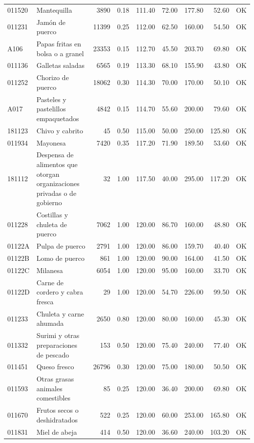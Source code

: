 \begin{table}[ht]
\begin{tabular}{llrrrrrrl}
  011520 & Mantequilla & 3890 & 0.18 & 111.40 & 72.00 & 177.80 & 52.60 & OK \\ 
  011231 & Jamón de puerco & 11399 & 0.25 & 112.00 & 62.50 & 160.00 & 54.50 & OK \\ 
  A106 & Papas fritas en bolsa o a granel & 23353 & 0.15 & 112.70 & 45.50 & 203.70 & 69.80 & OK \\ 
  011136 & Galletas saladas & 6565 & 0.19 & 113.30 & 68.10 & 155.90 & 43.80 & OK \\ 
  011252 & Chorizo de puerco & 18062 & 0.30 & 114.30 & 70.00 & 170.00 & 50.10 & OK \\ 
  A017 & Pasteles y pastelillos empaquetados & 4842 & 0.15 & 114.70 & 55.60 & 200.00 & 79.60 & OK \\ 
  181123 & Chivo y cabrito &  45 & 0.50 & 115.00 & 50.00 & 250.00 & 125.80 & OK \\ 
  011934 & Mayonesa & 7420 & 0.35 & 117.20 & 71.90 & 189.50 & 53.60 & OK \\ 
  181112 & Despensa de alimentos que otorgan organizaciones privadas o de gobierno &  32 & 1.00 & 117.50 & 40.00 & 295.00 & 117.20 & OK \\ 
  011228 & Costillas y chuleta de puerco & 7062 & 1.00 & 120.00 & 86.70 & 160.00 & 48.80 & OK \\ 
  01122A & Pulpa de puerco & 2791 & 1.00 & 120.00 & 86.00 & 159.70 & 40.40 & OK \\ 
  01122B & Lomo de puerco & 861 & 1.00 & 120.00 & 90.00 & 164.00 & 41.50 & OK \\ 
  01122C & Milanesa & 6054 & 1.00 & 120.00 & 95.00 & 160.00 & 33.70 & OK \\ 
  01122D & Carne de cordero y cabra fresca &  29 & 1.00 & 120.00 & 54.70 & 226.00 & 99.50 & OK \\ 
  011233 & Chuleta y carne ahumada & 2650 & 0.80 & 120.00 & 80.00 & 160.00 & 45.30 & OK \\ 
  011332 & Surimi y otras preparaciones de pescado & 153 & 0.50 & 120.00 & 75.40 & 240.00 & 77.40 & OK \\ 
  011451 & Queso fresco & 26796 & 0.30 & 120.00 & 75.00 & 180.00 & 50.50 & OK \\ 
  011593 & Otras grasas animales comestibles &  85 & 0.25 & 120.00 & 36.40 & 200.00 & 69.80 & OK \\ 
  011670 & Frutos secos o deshidratados & 522 & 0.25 & 120.00 & 60.00 & 253.00 & 165.80 & OK \\ 
  011831 & Miel de abeja & 414 & 0.50 & 120.00 & 36.60 & 240.00 & 103.20 & OK \\ 

\end{tabular}
\end{table}
